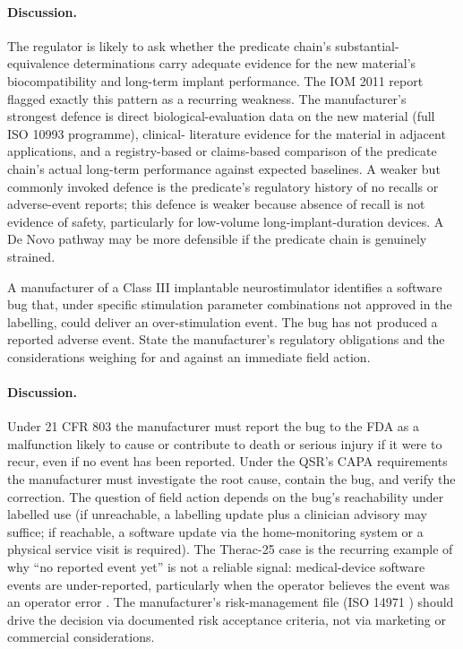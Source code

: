 \paragraph{Discussion.}
The regulator is likely to ask whether the predicate chain's
substantial-equivalence determinations carry adequate evidence for
the new material's biocompatibility and long-term implant
performance. The IOM 2011 report \cite{paper:v6c12-iom-510k-2011}
flagged exactly this pattern as a recurring weakness. The
manufacturer's strongest defence is direct biological-evaluation
data on the new material (full ISO 10993 programme), clinical-
literature evidence for the material in adjacent applications,
and a registry-based or claims-based comparison of the predicate
chain's actual long-term performance against expected baselines.
A weaker but commonly invoked defence is the predicate's regulatory
history of no recalls or adverse-event reports; this defence is
weaker because absence of recall is not evidence of safety,
particularly for low-volume long-implant-duration devices.
A De Novo pathway may be more defensible if the predicate chain
is genuinely strained.

\begin{exercise}
A manufacturer of a Class III implantable neurostimulator
identifies a software bug that, under specific stimulation
parameter combinations not approved in the labelling, could
deliver an over-stimulation event. The bug has not produced a
reported adverse event. State the manufacturer's regulatory
obligations and the considerations weighing for and against an
immediate field action.
\end{exercise}

\paragraph{Discussion.}
Under 21 CFR 803 the manufacturer must report the bug to the FDA
as a malfunction likely to cause or contribute to death or serious
injury if it were to recur, even if no event has been reported.
Under the QSR's CAPA requirements \cite{law:v6c12-21cfr-820} the
manufacturer must investigate the root cause, contain the bug,
and verify the correction. The question of field action depends on
the bug's reachability under labelled use (if unreachable, a
labelling update plus a clinician advisory may suffice; if
reachable, a software update via the home-monitoring system or a
physical service visit is required). The Therac-25 case is the
recurring example of why ``no reported event yet'' is not a
reliable signal: medical-device software events are under-reported,
particularly when the operator believes the event was an operator
error \cite{acc:therac-25-1985-1987, paper:leveson-turner1993,
std:v6c12-iec-62304-2015}. The manufacturer's risk-management file
(ISO 14971 \cite{std:v6c12-iso-14971-2019}) should drive the
decision via documented risk acceptance criteria, not via marketing
or commercial considerations.

